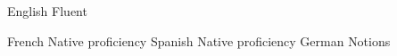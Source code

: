 
\begin{cvskills}

  \cvskill
    {English} %
    {Fluent} %

  \cvskill
    {French} %
    {Native proficiency} %
  \cvskill
    {Spanish} %
    {Native proficiency} %
  \cvskill
    {German} %
    {Notions} %

\end{cvskills}
